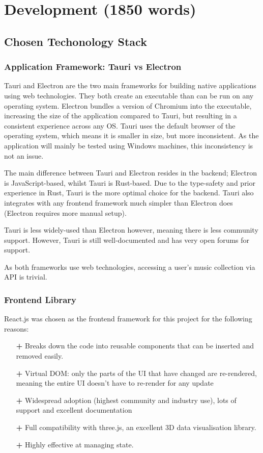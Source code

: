\chapter{Development (1850 words)}
\section{Chosen Techonology Stack}
\subsection{Application Framework: Tauri vs Electron}
Tauri and Electron are the two main frameworks for building native applications using web technologies. They both create an executable than can be run on any operating system. Electron bundles a version of Chromium into the executable, increasing the size of the application compared to Tauri, but resulting in a consistent experience across any OS. Tauri uses the default browser of the operating system, which means it is smaller in size, but more inconsistent. As the application will mainly be tested using Windows machines, this inconsistency is not an issue.

The main difference between Tauri and Electron resides in the backend; Electron is JavaScript-based, whilst Tauri is Rust-based. Due to the type-safety and prior experience in Rust, Tauri is the more optimal choice for the backend. Tauri also integrates with any frontend framework much simpler than Electron does (Electron requires more manual setup). 

Tauri is less widely-used than Electron however, meaning there is less community support. However, Tauri is still well-documented and has very open forums for support.

As both frameworks use web technologies, accessing a user's music collection via API is trivial.

\subsection{Frontend Library}
React.js was chosen as the frontend framework for this project for the following reasons:\begin{itemize}
    \item[\textbf{+}] Breaks down the code into reusable components that can be inserted and removed easily.
    \item[\textbf{+}] Virtual DOM: only the parts of the UI that have changed are re-rendered, meaning the entire UI doesn't have to re-render for any update
    \item[\textbf{+}] Widespread adoption (highest community and industry use), lots of support and excellent documentation
    \item[\textbf{+}] Full compatibility with three.js, an excellent 3D data visualisation library.
    \item[\textbf{+}] Highly effective at managing state.
\end{itemize}

